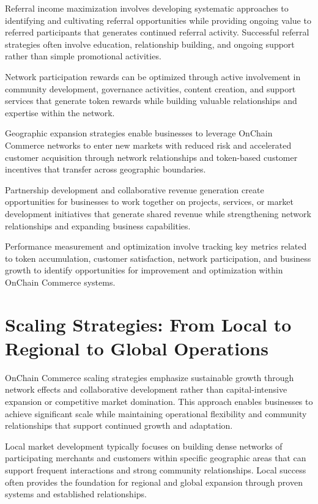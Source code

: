 \documentclass[
  Letterpaper,
]{scrbook}
\begin{document}
Referral income maximization involves developing systematic approaches
to identifying and cultivating referral opportunities while providing
ongoing value to referred participants that generates continued referral
activity. Successful referral strategies often involve education,
relationship building, and ongoing support rather than simple
promotional activities.

Network participation rewards can be optimized through active
involvement in community development, governance activities, content
creation, and support services that generate token rewards while
building valuable relationships and expertise within the network.

Geographic expansion strategies enable businesses to leverage OnChain
Commerce networks to enter new markets with reduced risk and accelerated
customer acquisition through network relationships and token-based
customer incentives that transfer across geographic boundaries.

Partnership development and collaborative revenue generation create
opportunities for businesses to work together on projects, services, or
market development initiatives that generate shared revenue while
strengthening network relationships and expanding business capabilities.

Performance measurement and optimization involve tracking key metrics
related to token accumulation, customer satisfaction, network
participation, and business growth to identify opportunities for
improvement and optimization within OnChain Commerce systems.

\section{Scaling Strategies: From Local to Regional to Global
Operations}\label{scaling-strategies-from-local-to-regional-to-global-operations}

OnChain Commerce scaling strategies emphasize sustainable growth through
network effects and collaborative development rather than
capital-intensive expansion or competitive market domination. This
approach enables businesses to achieve significant scale while
maintaining operational flexibility and community relationships that
support continued growth and adaptation.

Local market development typically focuses on building dense networks of
participating merchants and customers within specific geographic areas
that can support frequent interactions and strong community
relationships. Local success often provides the foundation for regional
and global expansion through proven systems and established
relationships.
\end{document}
